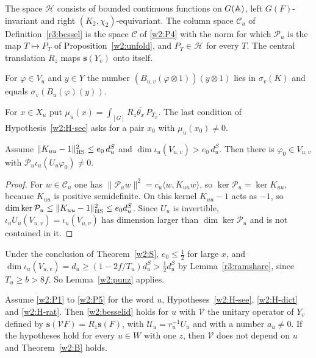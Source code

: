 \begin{hypothesis}[dictionaries]\label{w2:H-dict}
The space $\mathcal H$ consists of bounded continuous functions on $G(\mathbb A)$, left $G(F)$-invariant and right $(K_2,\chi_2)$-equivariant. The column space $\mathcal C_u$ of Definition~\ref{r3:bessel} is the space $\mathcal C$ of \ref{w2:P4} with the norm for which $\mathcal P_u$ is the map $T\mapsto P_T$ of Proposition~\ref{w2:unfold}, and $P_T\in\mathcal H$ for every $T$. The central translation $R_z$ maps $\mathbf s(Y_v)$ onto itself.
\end{hypothesis}

\begin{hypothesis}[rationality]\label{w2:H-rat}
For $\varphi\in V_u$ and $y\in Y$ the number $(B_{u,v}(\varphi\otimes1))(y\otimes1)$ lies in $\sigma_v(K)$ and equals $\sigma_v(B_u(\varphi)(y))$.
\end{hypothesis}

\begin{definition}\label{w2:anchor}
For $x\in X_u$ put $\mu_u(x)=\int_{[G]}R_z\overline{\theta_x}\,P_{T_x}$.
The last condition of Hypothesis~\ref{w2:H-see} asks for a pair $x_0$
with $\mu_u(x_0)\ne0$.
\end{definition}

\begin{lemma}\label{w2:punz}
Assume $\lVert K_{uu}-1\rVert_{\mathrm{HS}}^2\le e_0\,d^S_u$ and $\dim\iota_u(V_{u,v})>e_0\,d^S_u$. Then there is $\varphi_0\in V_{u,v}$ with $\mathcal P_u\iota_u(U_u\varphi_0)\ne0$.
\end{lemma}

\begin{proof}
For $w\in\mathcal C_u$ one has $\lVert\mathcal P_uw\rVert^2=c_u\langle w,K_{uu}w\rangle$, so $\ker\mathcal P_u=\ker K_{uu}$, because $K_{uu}$ is positive semidefinite. On this kernel $K_{uu}-1$ acts as $-1$, so $\dim\ker\mathcal P_u\le\lVert K_{uu}-1\rVert_{\mathrm{HS}}^2\le e_0d^S_u$. Since $U_u$ is invertible, $\iota_uU_u(V_{u,v})=\iota_u(V_{u,v})$ has dimension larger than $\dim\ker\mathcal P_u$ and is not contained in it.
\end{proof}

Under the conclusion of Theorem~\ref{w2:S}, $e_0\le\tfrac12$ for large $x$, and $\dim\iota_u(V_{u,v})=d_u\ge(1-2f/T_u)d^S_u>\tfrac12d^S_u$ by Lemma~\ref{r3:ramshare}, since $T_u\ge b>8f$. So Lemma~\ref{w2:punz} applies.

\begin{theorem}\label{w2:Bproof}
Assume \ref{w2:P1} to \ref{w2:P5} for the word $u$, Hypotheses~\ref{w2:H-see}, \ref{w2:H-dict} and \ref{w2:H-rat}. Then \eqref{w2:besselid} holds for $u$ with $\mathcal V$ the unitary operator of $Y_v$ defined by $\mathbf s(\mathcal VF)=R_z\mathbf s(F)$, with $\mathcal U_u=r_u^{-1}U_u$ and with a number $a_u\ne0$. If the hypotheses hold for every $u\in W$ with one $z$, then $\mathcal V$ does not depend on $u$ and Theorem~\ref{w2:B} holds.
\end{theorem}

